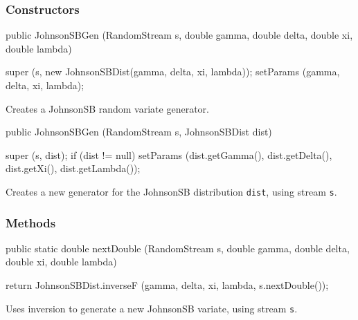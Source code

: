 \subsubsection* {Constructors}
\begin{code}

   public JohnsonSBGen (RandomStream s, double gamma, double delta,
                        double xi, double lambda) \begin{hide} {
      super (s, new JohnsonSBDist(gamma, delta, xi, lambda));
      setParams (gamma, delta, xi, lambda);
   }\end{hide}
\end{code}
\begin{tabb} Creates a JohnsonSB random variate generator.
\end{tabb}
\begin{code}

   public JohnsonSBGen (RandomStream s, JohnsonSBDist dist) \begin{hide} {
      super (s, dist);
      if (dist != null)
         setParams (dist.getGamma(), dist.getDelta(), dist.getXi(),
                    dist.getLambda());
   } \end{hide}
\end{code}
 \begin{tabb}  Creates a new generator for the JohnsonSB
   distribution \texttt{dist}, using stream \texttt{s}.
 \end{tabb}

\subsubsection* {Methods}
\begin{code}

   public static double nextDouble (RandomStream s, double gamma,
                                    double delta, double xi, double lambda) \begin{hide} {
      return JohnsonSBDist.inverseF (gamma, delta, xi, lambda,
                                        s.nextDouble());
   }\end{hide}
\end{code}
 \begin{tabb}  Uses inversion to generate a new JohnsonSB variate,
   using stream \texttt{s}.
 \end{tabb}
\begin{hide}
\begin{code}
}\end{code}
\end{hide}
